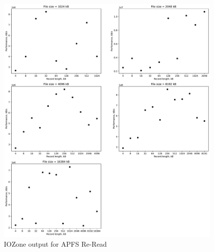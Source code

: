\begin{figure}[!htb]
	\label{fig:app_benchapfss_re_read}
	\begin{center}
		\includegraphics[width=1.0\textwidth]{figures/benchmarking/local/Re-Read.pdf}
	\end{center}
	\caption{IOZone output for \gls{APFS} \mbox{Re-Read}}
\end{figure}

